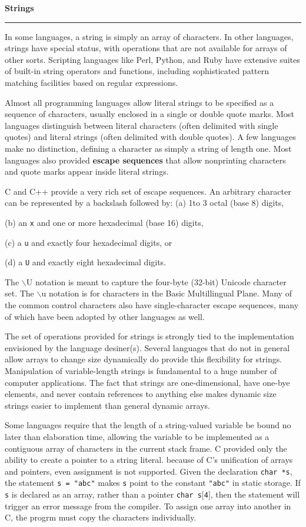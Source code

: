 \nopagenumbers
{\bf Strings}
\vskip 1mm
\hrule

\vskip 6pt
In some languages, a string is simply an array of characters. In other languages, strings have special status, with operations that are not available for arrays of other sorts. Scripting languages like Perl, Python, and Ruby have extensive suites of built-in string operators and functions, including sophisticated pattern matching facilities based on regular expressions.

\vskip 6pt
Almost all programming languages allow literal strings to be specified as a sequence of characters, usually enclosed in a single or double quote marks. Most languages distinguish between literal characters (often delimited with single quotes) and literal strings (often delimited with double quotes). A few languages make no distinction, defining a character as simply a string of length one. Most languages also provided {\bf escape sequences} that allow nonprinting characters and quote marks appear inside literal strings.

\vskip 6pt
C and C++ provide a very rich set of escape sequences. An arbitrary character can be represented by a backslash followed by:
\vskip 1mm
(a) 1to 3 octal (base 8) digits,

\vskip 1mm
(b) an {\tt x} and one or more hexadecimal (base 16) digits,

\vskip 1mm
(c) a {\tt u} and exactly four hexadecimal digits, or

\vskip 1mm
(d) a {\tt U} and exactly eight hexadecimal digits.

\vskip 6pt
The $\backslash$U notation is meant to capture the four-byte (32-bit) Unicode character set. The $\backslash$u notation is for characters in the Basic Multillingual Plane. Many of the common control characters also have single-character escape sequences, many of which have been adopted by other languages as well.

\vskip 6pt
The set of operations provided for strings is strongly tied to the implementation envisioned by the language desiner(s). Several languages that do not in general allow arrays to change size dynamically do provide this flexibility for strings. Manipulation of variable-length strings is fundamental to a huge number of computer applications. The fact that strings are one-dimensional, have one-bye elements, and never contain references to anything else makes dynamic size strings easier to implement than general dynamic arrays.

\vskip 6pt
Some languages require that the length of a string-valued variable be bound no later than elaboration time, allowing the variable to be implemented as a contiguous array of characters in the current stack frame. C provided only the ability to create a pointer to a string literal. because of C's unification of arrays and pointers, even assignment is not supported. Given the declaration {\tt char *s}, the statement {\tt s = "abc"} makes {\tt s} point to the constant {\tt "abc"} in static storage. If {\tt s} is declared as an array, rather than a pointer {\tt char s$\lbrack$4$\rbrack$}, then the statement will trigger an error message from the compiler. To assign one array into another in C, the progrm must copy the characters individually.

